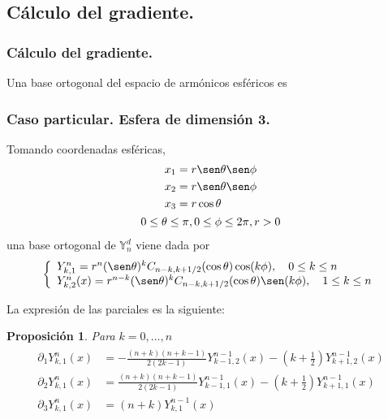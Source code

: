 \documentclass{beamer}
\theoremstyle{plain}
\theoremstyle{definition}
\theoremstyle{plain}
\newtheorem{prop}[thm]{Proposici\'{o}n}
\theoremstyle{definition}
\theoremstyle{remark}
\theoremstyle{definition}
\newcommand{\spharm}{\mathds{Y}^d_n}
\begin{document}
\subsection{Cálculo del gradiente.}
\begin{frame}
	\tableofcontents[currentsubsection]
\end{frame}
\begin{frame}
	\frametitle{Cálculo del gradiente.}
	Una base ortogonal del espacio de armónicos esféricos es 
	
\end{frame}
\begin{frame}
		\frametitle{Caso particular. Esfera de dimensión 3.}
		Tomando coordenadas esféricas,
		\begin{gather*}
		\begin{aligned}
		x_1 &= r \sen \theta \sen \phi\\
		x_2 &= r \sen \theta \sen \phi\\
		x_3 &= r \cos \theta\\
		\end{aligned}
		\\
		0\le \theta \le \pi,0\le\phi\le2\pi,r>0
		\end{gather*}
		una base ortogonal de $\spharm$ viene dada por
		\begin{equation*}
		\left\lbrace
		\begin{array}{ll}
		Y^n_ {k,1} = r^n(\sen \theta)^kC_{n-k,k+1/2}(\cos \theta) \cos(k\phi),\quad 0\le k\le n \\
		Y^n_{k,2}(x) = r^{n-k}(\sen\theta)^kC_{n-k,k+1/2}(\cos\theta)\sen(k\phi), \quad 1\le k\le n
		\end{array}
		\right.
		\end{equation*}
\end{frame}
\begin{frame}
La expresión de las parciales es la siguiente:
	\begin{prop} Para $k=0,...,n$
		\begin{gather*} 
		\begin{aligned}
		\partial_1Y^{n}_{k,1}(x) &= -\frac{(n+k)(n+k-1)}{2(2k-1)}Y^{n-1}_{k-1,2}(x)-(k+\frac{1}{2})Y^{n-1}_ {k+1,2}(x) \\
		\partial_2Y^{n}_{k,1}(x) &= \frac{(n+k)(n+k-1)}{2(2k-1)}Y^{n-1}_{k-1,1}(x)-(k+\frac{1}{2})Y^{n-1}_ {k+1,1}(x) \\
		\partial_3 Y_{k,1}^{n}(x) &=(n+k)Y_{k,1}^{n-1}(x)
		\end{aligned}
		\end{gather*}

	\end{prop}
\end{frame}
\end{document}
